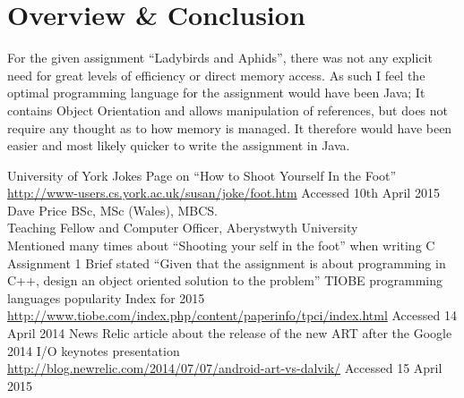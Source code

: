 \documentclass[10pt]{article}
\begin{document}
  \section{Overview \& Conclusion}
    For the given assignment ``Ladybirds and Aphids'', there was not any explicit need for great levels of efficiency or direct memory access. As such I feel the optimal programming language for the assignment would have been Java; It contains Object Orientation and allows manipulation of references, but does not require any thought as to how memory is managed. It therefore would have been easier and most likely quicker to write the assignment in Java. 

  \newpage

  \begin{thebibliography}{9}
      University of York Jokes Page on ``How to Shoot Yourself In the Foot''\\
      \url{http://www-users.cs.york.ac.uk/susan/joke/foot.htm} Accessed 10th April 2015
      Dave Price BSc, MSc (Wales), MBCS.\\Teaching Fellow and Computer Officer, Aberystwyth University\\
      Mentioned many times about ``Shooting your self in the foot'' when writing C
      Assignment 1 Brief stated ``Given that the assignment is about programming in C++, design an object oriented solution to the problem''
      TIOBE programming languages popularity Index for 2015 \\
      \url{http://www.tiobe.com/index.php/content/paperinfo/tpci/index.html} Accessed 14 April 2014
      News Relic article about the release of the new ART after the Google 2014 I/O keynotes presentation\\
      \url{http://blog.newrelic.com/2014/07/07/android-art-vs-dalvik/} Accessed 15 April 2015

  \end{thebibliography}
\end{document}
